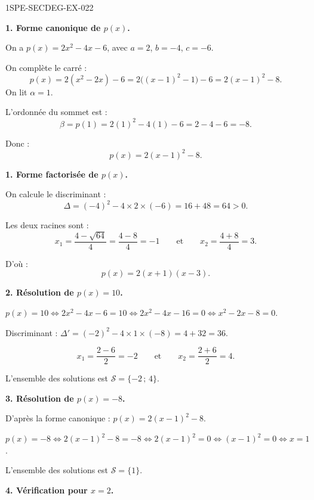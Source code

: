 \begin{corrige}{1SPE-SECDEG-EX-022}

\textbf{1. Forme canonique de $p(x)$.}


On a $p(x) = 2x^2 - 4x - 6$, avec $a = 2$, $b = -4$, $c = -6$.

On complète le carré :
\[p(x)=2(x^2-2x)-6=2\bigl((x-1)^2-1\bigr)-6=2(x-1)^2-8.\]
On lit $\alpha=1$.

L'ordonnée du sommet est :
\[\beta = p(1) = 2(1)^2 - 4(1) - 6 = 2 - 4 - 6 = -8.\]

Donc :
\[p(x) = 2(x - 1)^2 - 8.\]

\medskip
\textbf{1. Forme factorisée de $p(x)$.}


On calcule le discriminant :
\[\Delta = (-4)^2 - 4 \times 2 \times (-6) = 16 + 48 = 64 > 0.\]

Les deux racines sont :
\[x_1 = \frac{4 - \sqrt{64}}{4} = \frac{4 - 8}{4} = -1 \qquad \text{et} \qquad x_2 = \frac{4 + 8}{4} = 3.\]

D'où :
\[p(x) = 2(x + 1)(x - 3).\]

\medskip
\textbf{2. Résolution de $p(x) = 10$.}


$p(x) = 10 \iff 2x^2 - 4x - 6 = 10 \iff 2x^2 - 4x - 16 = 0 \iff x^2 - 2x - 8 = 0$.

Discriminant : $\Delta' = (-2)^2 - 4 \times 1 \times (-8) = 4 + 32 = 36$.

\[x_1 = \frac{2 - 6}{2} = -2 \qquad \text{et} \qquad x_2 = \frac{2 + 6}{2} = 4.\]

L'ensemble des solutions est $\mathcal{S} = \{-2\,;\,4\}$.

\medskip
\textbf{3. Résolution de $p(x) = -8$.}


D'après la forme canonique : $p(x) = 2(x-1)^2 - 8$.

$p(x) = -8 \iff 2(x-1)^2 - 8 = -8 \iff 2(x-1)^2 = 0 \iff (x-1)^2 = 0 \iff x = 1$.

L'ensemble des solutions est $\mathcal{S} = \{1\}$.

\medskip
\textbf{4. Vérification pour $x = 2$.}


\end{corrige}
